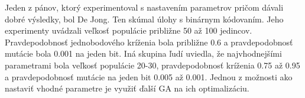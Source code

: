 Jeden z pánov, ktorý experimentoval s nastavením parametrov pričom dávali dobré výsledky, bol De Jong. Ten skúmal úlohy s binárnym kódovaním. Jeho experimenty uvádzali veľkosť populácie približne 50 až 100 jedincov. Pravdepodobnosť jednobodového kríženia bola približne 0.6 a pravdepodobnosť mutácie bola 0.001 na jeden bit. Iná skupina ľudí uviedla, že najvhodnejšími parametrami bola veľkosť populácie 20-30, pravdepodobnosť kríženia 0.75 až 0.95 a pravdepodobnosť mutácie na jeden bit 0.005 až 0.001. Jednou z možnosti ako nastaviť vhodné parametre je využiť ďalší GA na ich optimalizáciu.